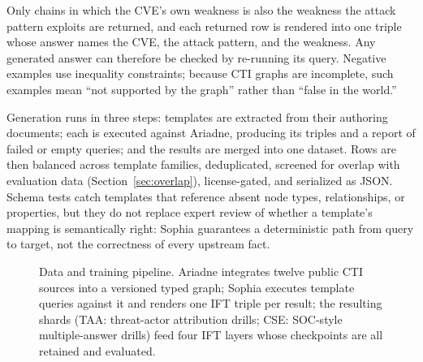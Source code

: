 \documentclass[conference]{IEEEtran}
\begin{document}
Only chains in which the CVE's own weakness is also the weakness the attack pattern exploits are returned, and each returned row is rendered into one triple whose answer names the CVE, the attack pattern, and the weakness. Any generated answer can therefore be checked by re-running its query. Negative examples use inequality constraints; because CTI graphs are incomplete, such examples mean ``not supported by the graph'' rather than ``false in the world.''

Generation runs in three steps: templates are extracted from their authoring documents; each is executed against Ariadne, producing its triples and a report of failed or empty queries; and the results are merged into one dataset. Rows are then balanced across template families, deduplicated, screened for overlap with evaluation data (Section~\ref{sec:overlap}), license-gated, and serialized as JSON. Schema tests catch templates that reference absent node types, relationships, or properties, but they do not replace expert review of whether a template's mapping is semantically right: Sophia guarantees a deterministic path from query to target, not the correctness of every upstream fact.

\begin{figure}[t]
    \centering
{}
    \caption{Data and training pipeline. Ariadne integrates twelve public CTI sources into a versioned typed graph; Sophia executes template queries against it and renders one IFT triple per result; the resulting shards (TAA: threat-actor attribution drills; CSE: SOC-style multiple-answer drills) feed four IFT layers whose checkpoints are all retained and evaluated.}
    \label{fig:pipeline}
\end{figure}
\end{document}
